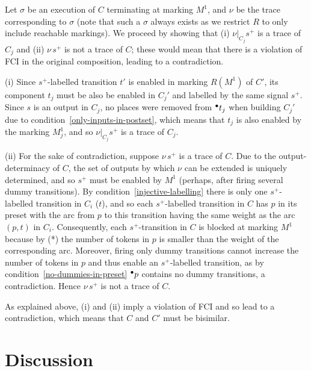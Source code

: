 Let $\sigma$ be an execution of $C$ terminating at marking $M^1$,
and $\nu$ be the trace corresponding to $\sigma$ (note that
such a $\sigma$ always exists as we restrict $R$ to only include reachable markings).
We proceed by showing that (i)
$\nu|_{C_j}s^+$ is a trace of $C_j$ and (ii) $\nu\, s^+$ is not
a trace of $C$; these would mean that there is a violation of
FCI in the original composition, leading to a contradiction.

(i) Since $s^+$-labelled transition $t'$ is enabled in marking $R(M^1)$ of $C'$, 
its component $t_j$ must be also be enabled in $C_j'$ and labelled by the same signal $s^+$.
Since $s$ is an output in $C_j$, no places were removed from ${}^\bullet {t_j}$ when building
$C_j'$ due to condition~\ref{only-inputs-in-postset}, which
means that $t_j$ is also enabled by the marking $M^1_j$, and so $\nu|_{C_j}s^+$
is a trace of $C_j$.

(ii) For the sake of contradiction, suppose $\nu\,s^+$ is a
trace of $C$. Due to the output-determinacy of $C$, the set of
outputs by which $\nu$ can be extended is uniquely determined,
and so $s^+$ must be enabled by $M^1$ (perhaps, after firing
several dummy transitions). By
condition~\ref{injective-labelling} there is only one
$s^+$-labelled transition in $C_i$ (\viz $t$), and so each
$s^+$-labelled transition in $C$ has $p$ in its preset with the
arc from $p$ to this transition having the same weight as the
arc $(p,t)$ in $C_i$. Consequently, each $s^+$-transition in
$C$ is blocked at marking $M^1$ because by (*) the number of tokens
in $p$ is smaller than the weight of the corresponding arc.
Moreover, firing only dummy transitions cannot increase the
number of tokens in $p$ and thus enable an $s^+$-labelled
transition, as by condition~\ref{no-dummies-in-preset}
${}^\bullet {p}$ contains no dummy transitions, a contradiction. Hence
$\nu\,s^+$ is not a trace of $C$.

As explained above, (i) and (ii) imply a violation of FCI and
so lead to a contradiction, which means that $C$ and
$C'$ must be bisimilar.

\section{Discussion}

